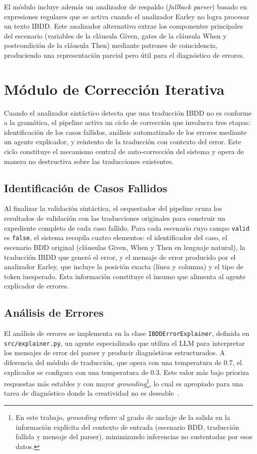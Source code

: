 El módulo incluye además un analizador de respaldo (\textit{fallback parser}) basado en expresiones regulares que se activa cuando el analizador Earley no logra procesar un texto IBDD. Este analizador alternativo extrae los componentes principales del escenario (variables de la cláusula Given, gates de la cláusula When y postcondición de la cláusula Then) mediante patrones de coincidencia, produciendo una representación parcial pero útil para el diagnóstico de errores.

\section{Módulo de Corrección Iterativa}
\label{sec:modulo-correccion}

Cuando el analizador sintáctico detecta que una traducción IBDD no es conforme a la gramática, el pipeline activa un ciclo de corrección que involucra tres etapas: identificación de los casos fallidos, análisis automatizado de los errores mediante un agente explicador, y reintento de la traducción con contexto del error. Este ciclo constituye el mecanismo central de auto-corrección del sistema y opera de manera no destructiva sobre las traducciones existentes.

\subsection{Identificación de Casos Fallidos}

Al finalizar la validación sintáctica, el orquestador del pipeline cruza los resultados de validación con las traducciones originales para construir un expediente completo de cada caso fallido. Para cada escenario cuyo campo \texttt{valid} es \texttt{false}, el sistema recopila cuatro elementos: el identificador del caso, el escenario BDD original (cláusulas Given, When y Then en lenguaje natural), la traducción IBDD que generó el error, y el mensaje de error producido por el analizador Earley, que incluye la posición exacta (línea y columna) y el tipo de token inesperado. Esta información constituye el insumo que alimenta al agente explicador de errores.

\subsection{Análisis de Errores}

El análisis de errores se implementa en la clase \texttt{IBDDErrorExplainer}, definida en \texttt{src/explainer.py}, un agente especializado que utiliza el LLM para interpretar los mensajes de error del parser y producir diagnósticos estructurados. A diferencia del módulo de traducción, que opera con una temperatura de $0.7$, el explicador se configura con una temperatura de $0.3$. Este valor más bajo prioriza respuestas más estables y con mayor \textit{grounding}\footnote{En este trabajo, \textit{grounding} refiere al grado de anclaje de la salida en la información explícita del contexto de entrada (escenario BDD, traducción fallida y mensaje del parser), minimizando inferencias no sustentadas por esos datos.}, lo cual es apropiado para una tarea de diagnóstico donde la creatividad no es deseable~\cite{renze2024temperature}.


